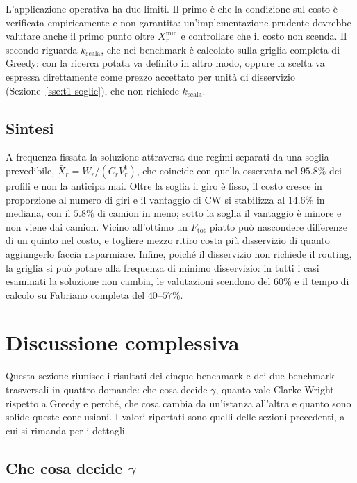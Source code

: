 L'applicazione operativa ha due limiti. Il primo è che la condizione sul costo è verificata empiricamente e non garantita: un'implementazione prudente dovrebbe valutare anche il primo punto oltre $X^{\min}_r$ e controllare che il costo non scenda. Il secondo riguarda $k_{\mathrm{scala}}$, che nei benchmark è calcolato sulla griglia completa di Greedy: con la ricerca potata va definito in altro modo, oppure la scelta va espressa direttamente come prezzo accettato per unità di disservizio (Sezione~\ref{sse:t1-soglie}), che non richiede $k_{\mathrm{scala}}$.

\subsection{Sintesi}\label{sse:t2-sintesi}

A frequenza fissata la soluzione attraversa due regimi separati da una soglia prevedibile, $\bar X_r=W_r/(C_r V^{\mathrm{t}}_r)$, che coincide con quella osservata nel $95.8\%$ dei profili e non la anticipa mai. Oltre la soglia il giro è fisso, il costo cresce in proporzione al numero di giri e il vantaggio di CW si stabilizza al $14.6\%$ in mediana, con il $5.8\%$ di camion in meno; sotto la soglia il vantaggio è minore e non viene dai camion. Vicino all'ottimo un $F_{\mathrm{tot}}$ piatto può nascondere differenze di un quinto nel costo, e togliere mezzo ritiro costa più disservizio di quanto aggiungerlo faccia risparmiare. Infine, poiché il disservizio non richiede il routing, la griglia si può potare alla frequenza di minimo disservizio: in tutti i casi esaminati la soluzione non cambia, le valutazioni scendono del $60\%$ e il tempo di calcolo su Fabriano completa del $40$--$57\%$.

\section{Discussione complessiva}\label{se:discussione}

Questa sezione riunisce i risultati dei cinque benchmark e dei due benchmark trasversali in quattro domande: che cosa decide $\gamma$, quanto vale Clarke-Wright rispetto a Greedy e perché, che cosa cambia da un'istanza all'altra e quanto sono solide queste conclusioni. I valori riportati sono quelli delle sezioni precedenti, a cui si rimanda per i dettagli.

\subsection{Che cosa decide \texorpdfstring{$\gamma$}{gamma}}\label{sse:disc-gamma}


